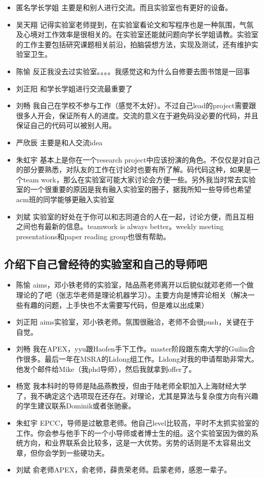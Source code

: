 \documentclass{vivid_layout}
\begin{document}
\begin{itemize}
\item {\name 匿名学长学姐}  \quad 主要是和别人进行交流。而且实验室也有更好的设备。
\item { 吴天翔} \quad 记得实验室老师提到，在实验室看论文和写程序也是一种氛围，气氛及心境对工作效率是很相关的。在实验室还能就问题向学长学姐请教。实验室的工作主要包括研究课题相关前沿，拍脑袋想方法，实现及测试，还有维护实验室卫生。
\item  { 陈愉}  \quad 反正我没去过实验室。。。。我感觉这和为什么自修要去图书馆是一回事
\item  { 刘正阳}  \quad 和学长学姐进行交流最重要了
\item  { 刘畅}  \quad 我自己在学校不参与工作（感觉不太好）。不过自己lead的project需要跟很多人开会，保证所有人的进度。交流的意义在于避免码没必要的代码，并且保证自己的代码可以被别人用。
\item  { 严欣辰}  \quad 主要是和人交流idea
\item  { 朱虹宇}  \quad 基本上是你在一个research project中应该扮演的角色。不仅仅是对自己的部分要熟悉，对队友的工作在讨论时也要有所了解。码代码这种，如果是一个team work，那么在实验室可能大家讨论会方便一些。另外我当时常去实验室的一个很重要的原因是我有融入实验室的圈子，据我所知一些导师也希望acm班的同学能够更融入实验室
\item  { 刘斌}  \quad 实验室的好处在于你可以和志同道合的人在一起，讨论方便，而且互相之间也有最新的信息。teamwork is always better。weekly meeting presentations和paper reading group也很有帮助。
\end{itemize}

\subsection{介绍下自己曾经待的实验室和自己的导师吧}
\begin{itemize}
\item  { 陈愉}  \quad  aims，邓小铁老师的实验室，陆品燕老师离开以后貌似就邓老师一个做理论的了吧（张志华老师是理论机器学习）。主要方向是博弈论相关（解决一些有趣的问题，上手快也不太需要写代码，但是难以出成果）
\item  { 刘正阳}  \quad aims实验室，邓小铁老师。氛围很融洽，老师不会很push，关键在于自觉。
\item  { 刘畅}  \quad 我在APEX，yyu跟Haofen手下工作。master阶段跟东南大学的Guilin合作很多。最后一年在MSRA的Lidong组工作。Lidong对我的申请帮助非常大。他发个邮件给Mike（我phd导师），然后我就拿到offer了。
\item  { 杨宽}  \quad 我本科时的导师是陆品燕教授，但由于陆老师全职加入上海财经大学了，我不确定这个选项现在还存在。对理论，尤其是算法与复杂度方向有兴趣的学生建议联系Dominik或者张驰豪。
\item  { 朱虹宇}  \quad EPCC，导师是过敏意老师。他自己level比较高，平时不太抓实验室的工作。你会参与他手下的一个小导师或者博士生的组。这个实验室因为做的系统方向，和业界联系会比较多，这是一大优势。劣势的话则是不太容易出文章，但你会学到一些硬功夫。
\item  { 刘斌}  \quad 俞老师APEX，俞老师，薛贵荣老师。启蒙老师，感恩一辈子。
\end{itemize}
\end{document}
